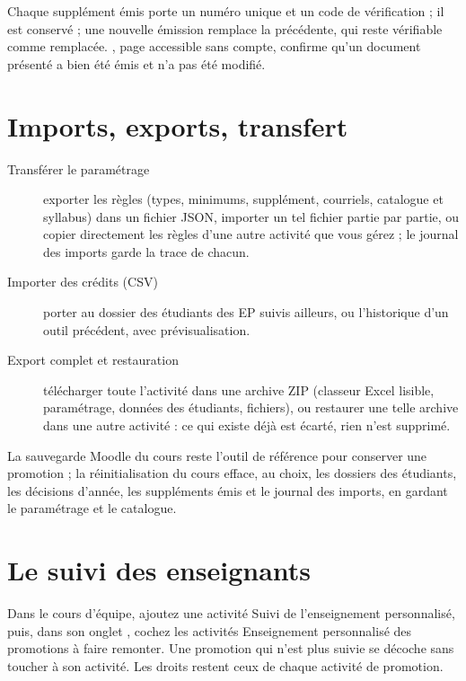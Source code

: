 \documentclass[11pt,a4paper]{article}
\begin{document}
Chaque supplément émis porte un numéro unique et un code de vérification ; il est conservé ;
une nouvelle émission remplace la précédente, qui reste vérifiable comme \og remplacée\fg{}.
, page accessible sans compte, confirme qu'un document présenté
a bien été émis et n'a pas été modifié.

\section{Imports, exports, transfert}\label{sec:transfert}

\begin{description}
  \item[Transférer le paramétrage] exporter les règles (types, minimums, supplément, courriels,
    catalogue et syllabus) dans un fichier JSON, importer un tel fichier partie par partie, ou
    copier directement les règles d'une autre activité que vous gérez ; le journal des imports
    garde la trace de chacun.
  \item[Importer des crédits (CSV)] porter au dossier des étudiants des EP suivis ailleurs, ou
    l'historique d'un outil précédent, avec prévisualisation.
  \item[Export complet et restauration] télécharger toute l'activité dans une archive ZIP
    (classeur Excel lisible, paramétrage, données des étudiants, fichiers), ou restaurer une
    telle archive dans une autre activité : ce qui existe déjà est écarté, rien n'est supprimé.
\end{description}



La sauvegarde Moodle du cours reste l'outil de référence pour conserver une promotion ; la
réinitialisation du cours efface, au choix, les dossiers des étudiants, les décisions d'année,
les suppléments émis et le journal des imports, en gardant le paramétrage et le catalogue.

\section{Le suivi des enseignants}\label{sec:synthese-admin}

Dans le cours d'équipe, ajoutez une activité \og Suivi de l'enseignement personnalisé\fg{}, puis,
dans son onglet , cochez les activités \og Enseignement personnalisé\fg{}
des promotions à faire remonter. Une promotion qui n'est plus suivie se décoche sans toucher à
son activité. Les droits restent ceux de chaque activité de promotion.
\end{document}
